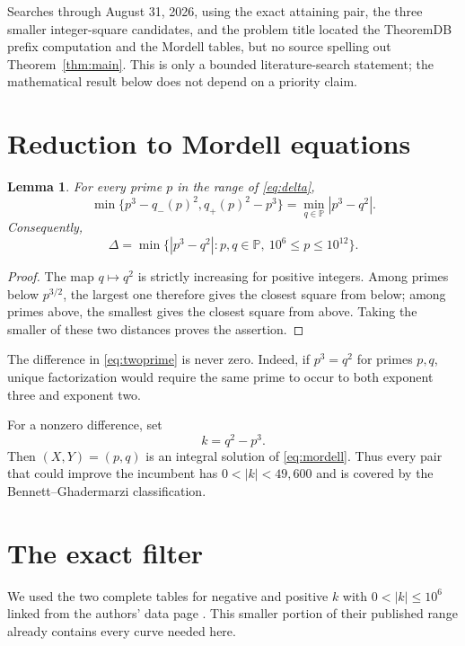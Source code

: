 \documentclass[11pt]{amsart}
\newtheorem{lemma}[theorem]{Lemma}
\theoremstyle{remark}
\newcommand{\PP}{\mathbb P}
\begin{document}
Searches through August 31, 2026, using the exact attaining pair, the three
smaller integer-square candidates, and the problem title located the
TheoremDB prefix computation and the Mordell tables, but no source spelling
out Theorem~\ref{thm:main}.  This is only a bounded literature-search
statement; the mathematical result below does not depend on a priority
claim.

\section{Reduction to Mordell equations}

\begin{lemma}\label{lem:adjacent}
For every prime $p$ in the range of \eqref{eq:delta},
\[
 \min\{p^3-q_-(p)^2,q_+(p)^2-p^3\}
 =\min_{q\in\PP}|p^3-q^2|.
\]
Consequently,
\begin{equation}\label{eq:twoprime}
 \Delta=\min\{|p^3-q^2|:p,q\in\PP,\ 10^6\le p\le10^{12}\}.
\end{equation}
\end{lemma}

\begin{proof}
The map $q\mapsto q^2$ is strictly increasing for positive integers.  Among
primes below $p^{3/2}$, the largest one therefore gives the closest square
from below; among primes above, the smallest gives the closest square from
above.  Taking the smaller of these two distances proves the assertion.
\end{proof}

The difference in \eqref{eq:twoprime} is never zero.  Indeed, if
$p^3=q^2$ for primes $p,q$, unique factorization would require the same prime
to occur to both exponent three and exponent two.

For a nonzero difference, set
\[
 k=q^2-p^3.
\]
Then $(X,Y)=(p,q)$ is an integral solution of \eqref{eq:mordell}.  Thus every
pair that could improve the incumbent has $0<|k|<49{,}600$ and is covered by
the Bennett--Ghadermarzi classification.

\section{The exact filter}

We used the two complete tables for negative and positive $k$ with
$0<|k|\le10^6$ linked from the authors' data page
\cite{BennettGhadermarzi2015}.  This smaller portion of their published
range already contains every curve needed here.
\end{document}
